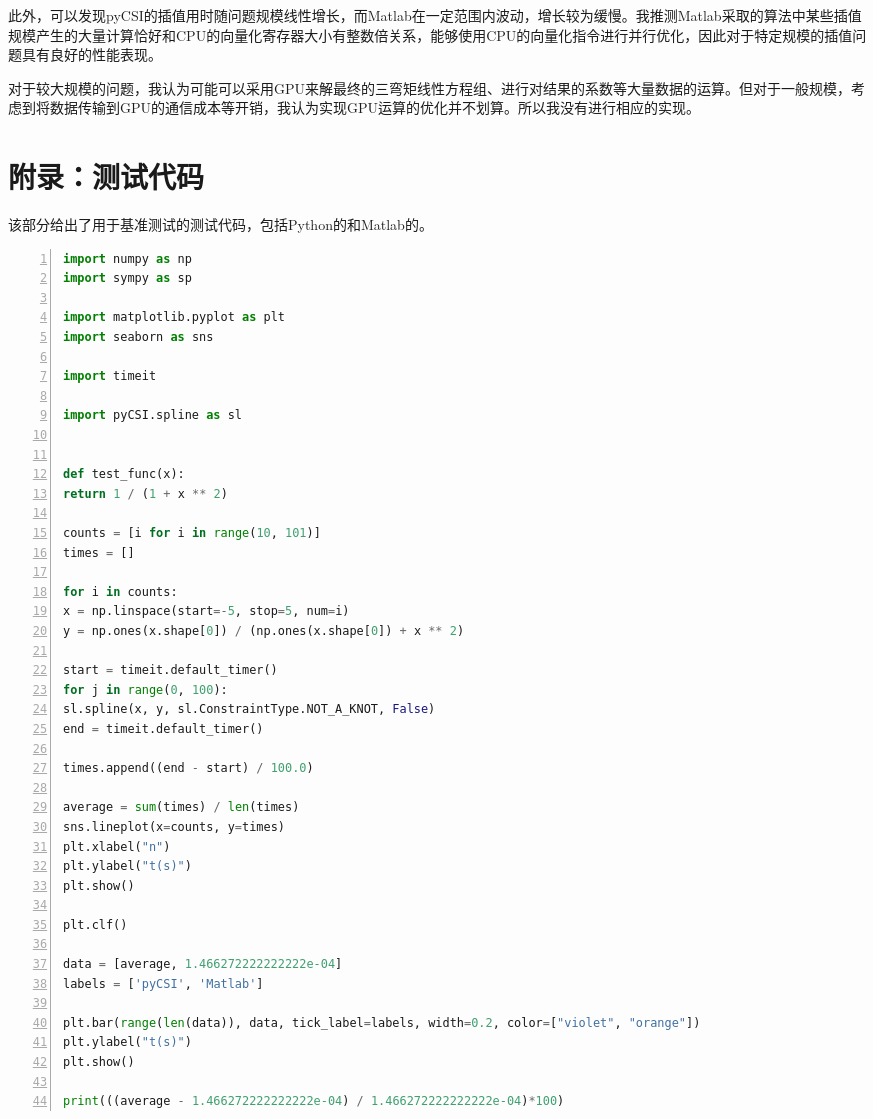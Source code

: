 \documentclass[a4paper,twoside]{article}
\begin{document}
\begin{spacing}{1.2}
此外，可以发现pyCSI的插值用时随问题规模线性增长，而Matlab在一定范围内波动，增长较为缓慢。我推测Matlab采取的算法中某些插值规模产生的大量计算恰好和CPU的向量化寄存器大小有整数倍关系，能够使用CPU的向量化指令进行并行优化，因此对于特定规模的插值问题具有良好的性能表现。

对于较大规模的问题，我认为可能可以采用GPU来解最终的三弯矩线性方程组、进行对结果的系数等大量数据的运算。但对于一般规模，考虑到将数据传输到GPU的通信成本等开销，我认为实现GPU运算的优化并不划算。所以我没有进行相应的实现。

\clearpage
\appendix

\section{附录：测试代码}
\label{sec:appA}

该部分给出了用于基准测试的测试代码，包括Python的和Matlab的。

\begin{lstlisting}[language=Python,numbers=left,style=PythonStyle,caption=Python性能测试用代码]
import numpy as np
import sympy as sp

import matplotlib.pyplot as plt
import seaborn as sns

import timeit

import pyCSI.spline as sl


def test_func(x):
return 1 / (1 + x ** 2)
	
counts = [i for i in range(10, 101)]
times = []

for i in counts:
x = np.linspace(start=-5, stop=5, num=i)
y = np.ones(x.shape[0]) / (np.ones(x.shape[0]) + x ** 2)

start = timeit.default_timer()
for j in range(0, 100):
sl.spline(x, y, sl.ConstraintType.NOT_A_KNOT, False)
end = timeit.default_timer()

times.append((end - start) / 100.0)

average = sum(times) / len(times)
sns.lineplot(x=counts, y=times)
plt.xlabel("n")
plt.ylabel("t(s)")
plt.show()

plt.clf()

data = [average, 1.466272222222222e-04]
labels = ['pyCSI', 'Matlab']

plt.bar(range(len(data)), data, tick_label=labels, width=0.2, color=["violet", "orange"])
plt.ylabel("t(s)")
plt.show()

print(((average - 1.466272222222222e-04) / 1.466272222222222e-04)*100)
\end{lstlisting}


\end{spacing}
\end{document}
